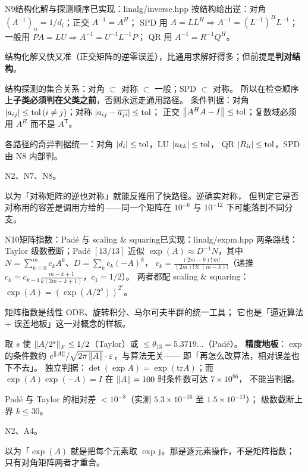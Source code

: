 \begin{know}{N9}{结构化解与探测顺序}{已实现：linalg/inverse.hpp}
 按结构给出逆：对角 $(A^{-1})_{ii}=1/d_i$；正交 $A^{-1}=A^{H}$；
SPD 用 $A=LL^{H}\Rightarrow A^{-1}=(L^{-1})^{H}L^{-1}$；一般用 $PA=LU\Rightarrow A^{-1}=U^{-1}L^{-1}P$；
QR 用 $A^{-1}=R^{-1}Q^{H}$。

 结构化解又快又准（正交矩阵的逆零误差），比通用求解好得多；但前提是\textbf{判对结构}。

 结构探测的集合关系：对角 $\subset$ 对称 $\subset$ 一般；SPD $\subset$ 对称。
所以在检查顺序上\textbf{子类必须判在父类之前}，否则永远走通用路径。
条件判据：对角 $\left\lvert a_{ij}\right\rvert\le\mathrm{tol}\,(i\ne j)$；对称 $\left\lvert a_{ij}-\overline{a_{ji}}\right\rvert\le\mathrm{tol}$；
正交 $\left\lVert A^{H}A-I\right\rVert\le\mathrm{tol}$；复数域必须用 $A^{H}$ 而不是 $A^{\mathsf T}$。

 各路径的奇异判据统一：对角 $\left\lvert d_i\right\rvert\le\mathrm{tol}$，LU $\left\lvert u_{kk}\right\rvert\le\mathrm{tol}$，
QR $\left\lvert R_{ii}\right\rvert\le\mathrm{tol}$，SPD 由 N8 内部判。

 N2、N7、N8。

 以为「对称矩阵的逆也对称」就能反推用了快路径。逆确实对称，
但判定它是否对称用的容差是调用方给的——同一个矩阵在 $10^{-6}$ 与 $10^{-12}$ 下可能落到不同分支。
\end{know}

\begin{know}{N10}{矩阵指数：Padé 与 scaling \& squaring}{已实现：linalg/expm.hpp}
 两条路线：Taylor 级数截断；Padé $[13/13]$ 近似
$\exp(A)\approx D^{-1}N$，其中 $N=\sum_{k=0}^{m}c_kA^{k}$、$D=\sum_k c_k(-A)^{k}$，
$c_k=\frac{(2m-k)!\,m!}{(2m)!\,k!\,(m-k)!}$（递推 $c_k=c_{k-1}\frac{m-k+1}{k(2m-k+1)}$，$c_1=1/2$）。
两者都配 scaling \& squaring：$\exp(A)=(\exp(A/2^{s}))^{2^{s}}$。

 矩阵指数是线性 ODE、旋转积分、马尔可夫半群的统一工具；
它也是「逼近算法 + 误差地板」这一对概念的样板。

 取 $s$ 使 $\left\lVert A/2^{s}\right\rVert_{F}\le1/2$（Taylor）或 $\le\theta_{13}=5.3719\ldots$（Padé）。
\textbf{精度地板}：$\exp$ 的条件数约 $e^{\left\lVert A\right\rVert}/\sqrt{2\pi\left\lVert A\right\rVert}\cdot\varepsilon$，与算法无关——
即「再怎么改算法，相对误差也下不去」。
独立判据：$\det(\exp A)=\exp(\mathrm{tr}A)$；而 $\exp(A)\exp(-A)=I$ 在 $\left\lVert A\right\rVert=100$ 时条件数可达 $7\times10^{86}$，
不能当判据。

 Padé 与 Taylor 的相对差 $<10^{-8}$（实测 $5.3\times10^{-16}$ 至 $1.5\times10^{-13}$）；
级数截断上界 $k\le30$。

 N2、A4。

 以为「$\exp(A)$ 就是把每个元素取 $\exp$」。那是逐元素操作，不是矩阵指数；
只有对角矩阵两者才重合。
\end{know}

